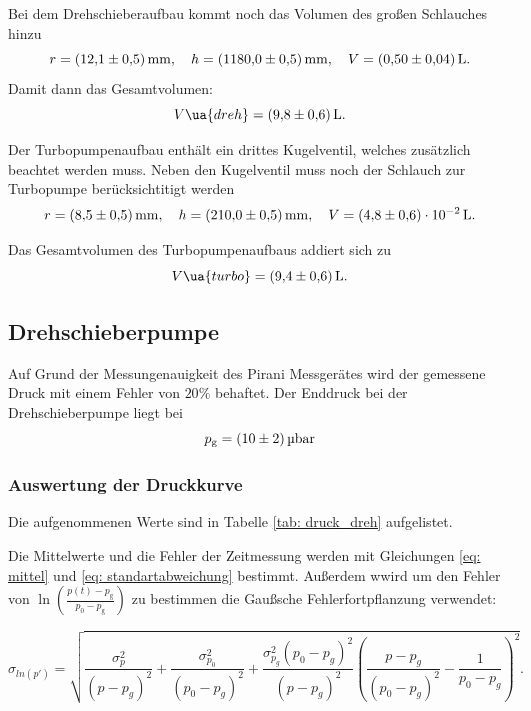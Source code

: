 Bei dem Drehschieberaufbau kommt noch das Volumen des großen Schlauches  hinzu
\begin{equation*}
  r=\SI{12.1\pm 0.5}{\milli\meter}, \quad h=\SI{1180\pm0.5}{\milli\meter}, \quad V=\SI{ 0.5\pm0.04}{\litre}.
\end{equation*}
Damit dann das Gesamtvolumen:
\begin{equation}
  \label{eq:volumen_drehschieber}
  V\ua{dreh}=\SI{9.8\pm0.6}{\litre}.
\end{equation}

Der Turbopumpenaufbau enthält ein drittes Kugelventil, welches zusätzlich beachtet werden muss.
Neben den Kugelventil muss noch der Schlauch zur Turbopumpe  berücksichtitigt werden
\begin{equation*}
  r=\SI{8.5\pm 0.5}{\milli\meter}, \quad h=\SI{210\pm0.5}{\milli\meter}, \quad V=\SI{ 4.8\pm0.6 e-2}{\litre}.
\end{equation*}

Das Gesamtvolumen des Turbopumpenaufbaus addiert sich zu
\begin{equation}
  \label{eq:volume_turbo}
  V\ua{turbo}=\SI{9.4\pm0.6}{\litre}.
\end{equation}
\subsection{Drehschieberpumpe}
Auf Grund der Messungenauigkeit des Pirani Messgerätes wird der gemessene
Druck mit einem Fehler von $20\%$ behaftet.
Der Enddruck bei der Drehschieberpumpe liegt bei
\begin{equation}
  \label{eq:enddruck_drehschieber}
  p_{\mathrm{g}}=\SI{10 \pm 2 }{\micro\bar}
\end{equation}

\subsubsection{Auswertung der Druckkurve}

Die aufgenommenen Werte sind in Tabelle \ref{tab: druck_dreh} aufgelistet.

Die Mittelwerte und die Fehler der Zeitmessung werden mit Gleichungen \eqref{eq: mittel} und
\eqref{eq: standartabweichung} bestimmt. Außerdem wwird um den Fehler von $\ln(\frac{ p(t)-p_{ \mathrm{g} } }{ p_0-p_{ \mathrm{g} } })$
 zu bestimmen die Gaußsche Fehlerfortpflanzung verwendet:

\begin{equation}
  \label{eq: fehler_ln_druck}
  \sigma_{ln(p')}=\sqrt{\frac{\sigma_{p}^{2}}{\left(p - p_{g}\right)^{2}} + \frac{\sigma_{p_{0}}^{2}}{\left(p_{0} - p_{g}\right)^{2}} + \frac{\sigma_{p_{g}}^{2} \left(p_{0} - p_{g}\right)^{2}}{\left(p - p_{g}\right)^{2}} \left(\frac{p - p_{g}}{\left(p_{0} - p_{g}\right)^{2}} - \frac{1}{p_{0} - p_{g}}\right)^{2}}.
\end{equation}

